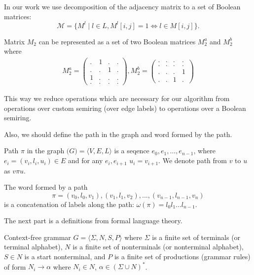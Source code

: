 In our work we use decomposition of the adjacency matrix to a set of Boolean matrices: 
$$
\mathcal{M} = \{M^l \mid l \in L, M^l[i,j]=1 \iff l \in M[i,j]\}.
$$

Matrix $M_2$ can be represented as a set of two Boolean matrices $M_2^a$ and $M_2^b$ where
\begin{align}
M_2^{a} =
\begin{pmatrix}
    . & 1 & . & .   \\
    . & . & 1 & .   \\
    1 & . & . & .   \\
    . & . & . & .  
\end{pmatrix}, 
M_2^{b} =
\begin{pmatrix}      
    . & . & . & .   \\
    . & . & . & .   \\
    . & . & . & 1   \\
    . & . & 1 & . 
\end{pmatrix} \label{eq:boolean_decomposition_of_graph}
\end{align}


This way we reduce operations which are necessary for our algorithm from operations over custom semiring (over edge labels) to operations over a Boolean semiring.

Also, we should define the path in the graph and word formed by the path.

\begin{definition}
Path $\pi$ in the graph $\mathcal(G) = \langle V,E,L \rangle$ is a seqence $e_0,e_1,\ldots,e_{n-1}$, where $e_i = (v_i,l_i,u_i) \in E$ and for any $e_i, e_{i+1}$ $u_i = v_{i+1}$. We denote path from $v$ to $u$ as $v\pi u$.   
\end{definition}

\begin{definition}
The word formed by a path $$\pi = (v_0,l_0,v_1),(v_1,l_1,v_2),\ldots,(v_{n-1},l_{n-1},v_n)$$ is a concatenation of labels along the path: $\omega(\pi) = l_0 l_1 \ldots l_{n-1}$.
\end{definition}

The next part is a definitions from formal language theory.
\begin{definition} 
Context-free grammar $G = \langle\Sigma, N, S, P\rangle$ where $\Sigma$ is a finite set of terminals (or terminal alphabet), $N$ is a finite set of nonterminals (or nonterminal alphabet), $S \in N$ is a start nonterminal, and $P$ is a finite set of productions (grammar rules) of form $N_i \to \alpha$ where  $N_i \in N$, $\alpha \in (\Sigma \cup N)^*$.
\end{definition}

